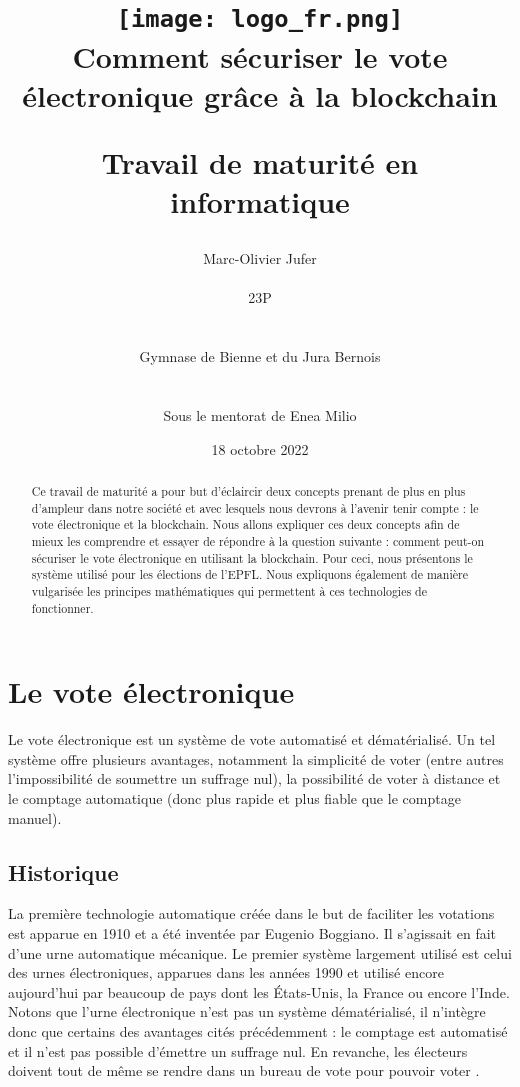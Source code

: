 \documentclass[10pt,a4paper,twoside]{article}
\date{18 octobre 2022}
\author{
		Marc-Olivier Jufer \\
		\begin{normalsize}23P\end{normalsize}\\
		\begin{normalsize} Gymnase de Bienne et du Jura Bernois \end{normalsize}\\
			\begin{normalsize} Sous le mentorat de Enea Milio \end{normalsize}
			\vspace{2 cm}
}
\title{	\texttt{[image: logo\_fr.png]}\\
		\vspace{2 cm}
		Comment sécuriser le vote électronique grâce à la blockchain\\ 
		\begin{large} 
			Travail de maturité en informatique
		\end{large} 
		\vspace{2 cm}
}
\numberwithin{equation}{section}
\begin{document}
	
	\begin{titlingpage}		
		\maketitle		
		\vspace{2 cm}
		\begin{abstract}
	Ce travail de maturité a pour but d’éclaircir deux concepts prenant de plus en plus d’ampleur dans notre société
et avec lesquels nous devrons à l’avenir tenir compte : le vote électronique et la blockchain. Nous allons expliquer ces
deux concepts afin de mieux les comprendre et essayer de répondre à la question suivante : comment peut-on sécuriser le vote électronique en utilisant la blockchain. Pour ceci, nous présentons le système utilisé pour les élections de l'EPFL. Nous expliquons également de manière vulgarisée les principes mathématiques qui permettent à ces technologies de fonctionner.
\end{abstract}	
		
	\end{titlingpage}
	
	
	\tableofcontents
	
	
\newpage	

	
\section{Le vote électronique}
	Le vote électronique est un système de vote automatisé et dématérialisé. Un tel système offre plusieurs avantages, notamment la simplicité de voter (entre autres l'impossibilité de soumettre un suffrage nul), la possibilité de voter à distance et le comptage automatique (donc plus rapide et plus fiable que le comptage manuel)\cite{wiki:Vote_electronique}\cite{chf}.

	\subsection{Historique}
		La première technologie automatique créée dans le but de faciliter les votations est apparue en 1910 et a été inventée par Eugenio Boggiano. Il s'agissait en fait d'une urne automatique mécanique. Le premier système largement utilisé est celui des urnes électroniques, apparues dans les années 1990 et utilisé encore aujourd'hui par beaucoup de pays dont les États-Unis, la France ou encore l'Inde. Notons que l'urne électronique n'est pas un système dématérialisé, il n'intègre donc que certains des avantages cités précédemment : le comptage est automatisé et il n'est pas possible d'émettre un suffrage nul. En revanche, les électeurs doivent tout de même se rendre dans un bureau de vote pour pouvoir voter \cite{wiki:Vote_electronique}.\\
		
\end{document}
